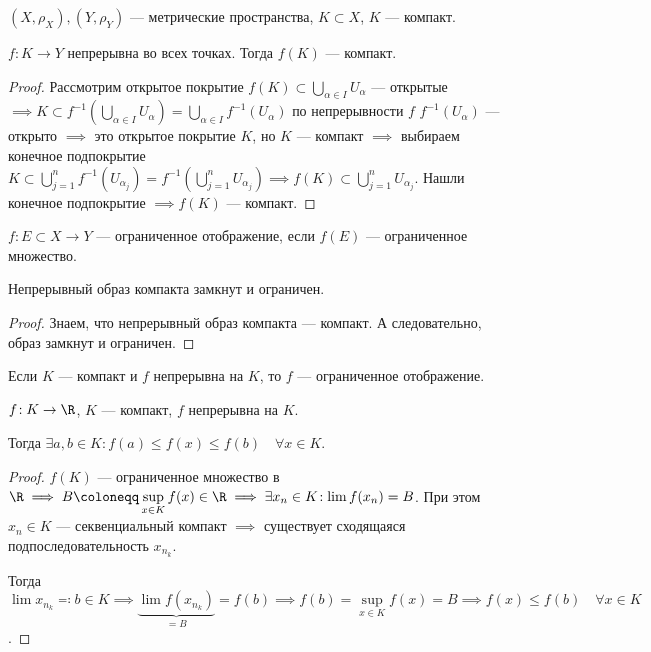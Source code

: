 \begin{theorem}
    $(X, \rho_X), (Y, \rho_Y)$ --- метрические пространства, $K \subset X$,  $K$ --- компакт.

    $f\!: K \to Y$ непрерывна во всех точках. Тогда  $f(K)$ --- компакт.
\end{theorem}
\begin{proof}
    Рассмотрим открытое покрытие $f(K) \subset \bigcup\limits_{\alpha \in I} U_\alpha$ --- открытые $\implies K \subset f^{-1}(\bigcup\limits_{\alpha \in I} U_\alpha) = \bigcup\limits_{\alpha \in I} f^{-1}(U_\alpha)$ по непрерывности $f$  $f^{-1}(U_\alpha)$ --- открыто  $\implies$ это открытое покрытие  $K$, но  $K$ --- компакт  $\implies$ выбираем конечное подпокрытие  $K \subset \bigcup\limits_{j=1}^n f^{-1}(U_{\alpha_j}) = f^{-1}(\bigcup\limits_{j=1}^n U_{\alpha_j}) \implies f(K) \subset \bigcup\limits_{j=1}^n U_{\alpha_j}$. Нашли конечное подпокрытие  $\implies f(K)$ --- компакт.
\end{proof}

\begin{definition}
    $f\!: E \subset X \to Y$ --- ограниченное отображение, если  $f(E)$ --- ограниченное множество.
\end{definition}
\begin{consequence}
    Непрерывный образ компакта замкнут и ограничен.
\end{consequence}
\begin{proof}
    Знаем, что непрерывный образ компакта --- компакт. А следовательно, образ замкнут и ограничен.
\end{proof}
\begin{consequence}
    Если $K$ --- компакт и  $f$ непрерывна на  $K$, то $f$ --- ограниченное отображение.
\end{consequence}
\begin{consequence}
    $f\!: K \to \R$,  $K$ --- компакт,  $f$ непрерывна на  $K$.

    Тогда  $\exists a,b \in K\!: f(a) \le f(x) \le f(b) \quad \forall x \in K$.
\end{consequence}
\begin{proof}
    $f(K)$ --- ограниченное множество в  $\R \implies B \coloneqq \sup\limits_{x \in K} f(x) \in \R \implies \exists x_n \in K\!: \lim f(x_n) = B$. При этом  $x_n \in K$ --- секвенциальный компакт  $\implies$ существует сходящаяся подпоследовательность $x_{n_k}$.

    Тогда  $\lim x_{n_k} \eqqcolon b \in K \implies \underbrace{\lim f(x_{n_k})}_{=B} = f(b) \implies f(b) = \sup\limits_{x \in K} f(x) = B \implies f(x) \le f(b) \quad \forall x \in K$.
\end{proof}
